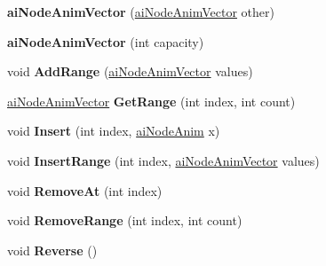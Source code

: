 \begin{DoxyCompactItemize}
\item 
\hypertarget{classai_node_anim_vector_a8c4cf6c8a2231b1cddfa11a428bdf578}{{\bfseries ai\+Node\+Anim\+Vector} (\hyperlink{classai_node_anim_vector}{ai\+Node\+Anim\+Vector} other)}\label{classai_node_anim_vector_a8c4cf6c8a2231b1cddfa11a428bdf578}

\item 
\hypertarget{classai_node_anim_vector_a30be5bb45548a3719601e89a90c2b2a4}{{\bfseries ai\+Node\+Anim\+Vector} (int capacity)}\label{classai_node_anim_vector_a30be5bb45548a3719601e89a90c2b2a4}

\item 
\hypertarget{classai_node_anim_vector_a9254c2eb8ca7679cb592bcf64edc21d8}{void {\bfseries Add\+Range} (\hyperlink{classai_node_anim_vector}{ai\+Node\+Anim\+Vector} values)}\label{classai_node_anim_vector_a9254c2eb8ca7679cb592bcf64edc21d8}

\item 
\hypertarget{classai_node_anim_vector_ac7a7b1e1b53c41cbf446ee85b9937bbc}{\hyperlink{classai_node_anim_vector}{ai\+Node\+Anim\+Vector} {\bfseries Get\+Range} (int index, int count)}\label{classai_node_anim_vector_ac7a7b1e1b53c41cbf446ee85b9937bbc}

\item 
\hypertarget{classai_node_anim_vector_a90247ceead503ee6d4e7a0c4944ae9fc}{void {\bfseries Insert} (int index, \hyperlink{structai_node_anim}{ai\+Node\+Anim} x)}\label{classai_node_anim_vector_a90247ceead503ee6d4e7a0c4944ae9fc}

\item 
\hypertarget{classai_node_anim_vector_a2236fe383943bea0dd06491461fa5291}{void {\bfseries Insert\+Range} (int index, \hyperlink{classai_node_anim_vector}{ai\+Node\+Anim\+Vector} values)}\label{classai_node_anim_vector_a2236fe383943bea0dd06491461fa5291}

\item 
\hypertarget{classai_node_anim_vector_af0a06cad1b6d6a7e37a0b55df00cb869}{void {\bfseries Remove\+At} (int index)}\label{classai_node_anim_vector_af0a06cad1b6d6a7e37a0b55df00cb869}

\item 
\hypertarget{classai_node_anim_vector_abd2b5b5f1a55211999bbb17279ec45ff}{void {\bfseries Remove\+Range} (int index, int count)}\label{classai_node_anim_vector_abd2b5b5f1a55211999bbb17279ec45ff}

\item 
\hypertarget{classai_node_anim_vector_aa488d912585498b7f8ec357063ce08ae}{void {\bfseries Reverse} ()}\label{classai_node_anim_vector_aa488d912585498b7f8ec357063ce08ae}


\end{DoxyCompactItemize}
